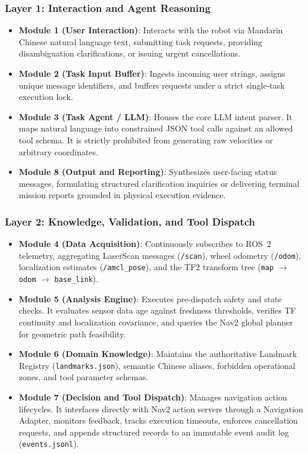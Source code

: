 \documentclass[conference]{IEEEtran}
\begin{document}
\subsubsection{Layer 1: Interaction and Agent Reasoning}
\begin{itemize}
    \item \textbf{Module 1 (User Interaction)}: Interacts with the robot via Mandarin Chinese natural language text, submitting task requests, providing disambiguation clarifications, or issuing urgent cancellations.
    \item \textbf{Module 2 (Task Input Buffer)}: Ingests incoming user strings, assigns unique message identifiers, and buffers requests under a strict single-task execution lock.
    \item \textbf{Module 3 (Task Agent / LLM)}: Houses the core LLM intent parser. It maps natural language into constrained JSON tool calls against an allowed tool schema. It is strictly prohibited from generating raw velocities or arbitrary coordinates.
    \item \textbf{Module 8 (Output and Reporting)}: Synthesizes user-facing status messages, formulating structured clarification inquiries or delivering terminal mission reports grounded in physical execution evidence.
\end{itemize}

\subsubsection{Layer 2: Knowledge, Validation, and Tool Dispatch}
\begin{itemize}
    \item \textbf{Module 4 (Data Acquisition)}: Continuously subscribes to ROS~2 telemetry, aggregating LaserScan messages (\texttt{/scan}), wheel odometry (\texttt{/odom}), localization estimates (\texttt{/amcl\_pose}), and the TF2 transform tree (\texttt{map} $\to$ \texttt{odom} $\to$ \texttt{base\_link}).
    \item \textbf{Module 5 (Analysis Engine)}: Executes pre-dispatch safety and state checks. It evaluates sensor data age against freshness thresholds, verifies TF continuity and localization covariance, and queries the Nav2 global planner for geometric path feasibility.
    \item \textbf{Module 6 (Domain Knowledge)}: Maintains the authoritative Landmark Registry (\texttt{landmarks.json}), semantic Chinese aliases, forbidden operational zones, and tool parameter schemas.
    \item \textbf{Module 7 (Decision and Tool Dispatch)}: Manages navigation action lifecycles. It interfaces directly with Nav2 action servers through a Navigation Adapter, monitors feedback, tracks execution timeouts, enforces cancellation requests, and appends structured records to an immutable event audit log (\texttt{events.jsonl}).
\end{itemize}
\end{document}
